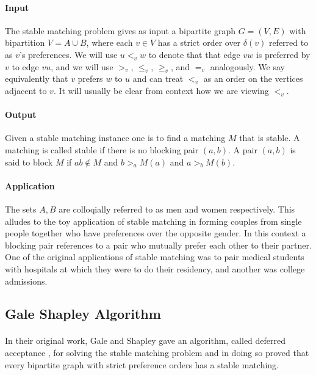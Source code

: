 \paragraph{Input}The stable matching problem gives as input a bipartite graph $G=(V, E)$ with bipartition $V = A\cup B$, where each $v \in V$ has a strict order over $\delta(v)$ referred to as $v$'s preferences. We will use $u <_v w$ to denote that that edge $vw$ is preferred by $v$ to edge $vu$, and we will use $>_v$, $\leq_v$, $\geq_v$, and $=_v$ analogously. We say equivalently that $v$ prefers $w$ to $u$ and can treat $<_v$ as an order on the vertices adjacent to $v$. It will usually be clear from context how we are viewing $<_v$.
\paragraph{Output} Given a stable matching instance one is to find a matching $M$ that is stable. A matching is called stable if there is no blocking pair $(a,b)$. A pair $(a,b)$ is said to block $M$ if $ab \not\in M$ and $b >_a M(a)$ and $a >_b M(b)$.
\paragraph{Application} The sets $A,B$ are colloqially referred to as men and women respectively. This alludes to the toy application of stable matching in forming couples from single people together who have preferences over the opposite gender. In this context a blocking pair references to a pair who mutually prefer each other to their partner. One of the original applications of stable matching \cite{roth1984evolution} was to pair medical students with hospitals at which they were to do their residency, and another was college admissions.
\subsection{Gale Shapley Algorithm}
\paragraph{}
In their original work, Gale and Shapley gave an algorithm, called deferred acceptance \cite{gale1962college}, for solving the stable matching problem and in doing so proved that every bipartite graph with strict preference orders has a stable matching.
